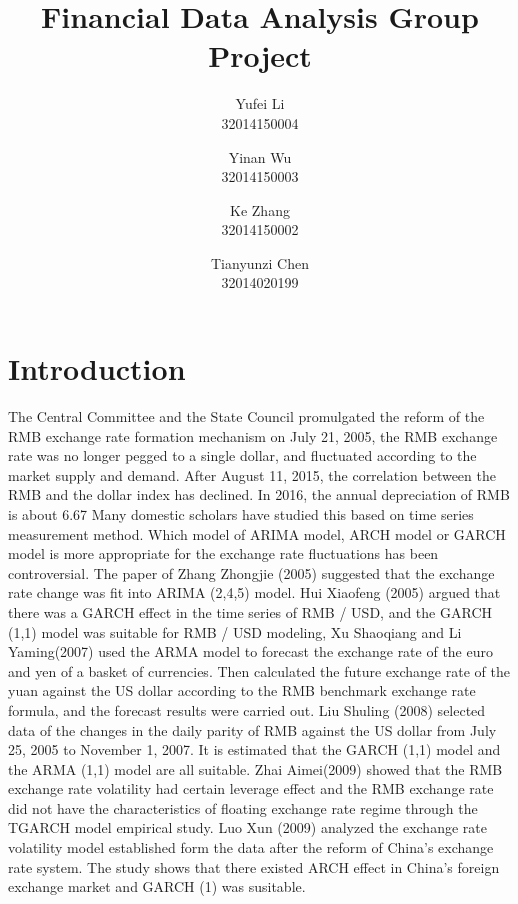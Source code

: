 \documentclass[12pt, a4paper, titlepage]{article}
\title{Financial Data Analysis Group Project\\
}
\author{Yufei Li  \\
	32014150004  \\
	\and 
	Yinan Wu \\
	32014150003 \\
	\and
	Ke Zhang\\
	32014150002\\
	\and
	Tianyunzi Chen\\
	32014020199
	}
\date{}
\begin{document}
\maketitle

\begin{abstract}

\end{abstract}

\tableofcontents 

\section{Introduction}
The Central Committee and the State Council promulgated the reform of the RMB exchange rate formation mechanism on July 21, 2005, the RMB exchange rate was no longer pegged to a single dollar, and fluctuated according to the market supply and demand. After August 11, 2015, the correlation between the RMB and the dollar index has declined. In 2016, the annual depreciation of RMB is about 6.67%
Many domestic scholars have studied this based on time series measurement method. Which model of ARIMA model, ARCH model or GARCH model is more appropriate for the exchange rate fluctuations has been controversial. The paper of Zhang Zhongjie (2005) suggested that the exchange rate change was fit into ARIMA (2,4,5) model. Hui Xiaofeng (2005) argued that there was a GARCH effect in the time series of RMB / USD, and the GARCH (1,1) model was suitable for RMB / USD modeling, Xu Shaoqiang and Li Yaming(2007) used the ARMA model to forecast the exchange rate of the euro and yen of a basket of currencies. Then calculated the future exchange rate of the yuan against the US dollar according to the RMB benchmark exchange rate formula, and the forecast results were carried out. Liu Shuling (2008) selected data of the changes in the daily parity of RMB against the US dollar from July 25, 2005 to November 1, 2007. It is estimated that the GARCH (1,1) model and the ARMA (1,1) model are all suitable. Zhai Aimei(2009) showed that the RMB exchange rate volatility had certain leverage effect and the RMB exchange rate did not have the characteristics of floating exchange rate regime through the TGARCH model empirical study. Luo Xun (2009) analyzed the exchange rate volatility model established form the data after the reform of China's exchange rate system. The study shows that there existed ARCH effect in China's foreign exchange market and GARCH (1) was susitable.
\end{document}
